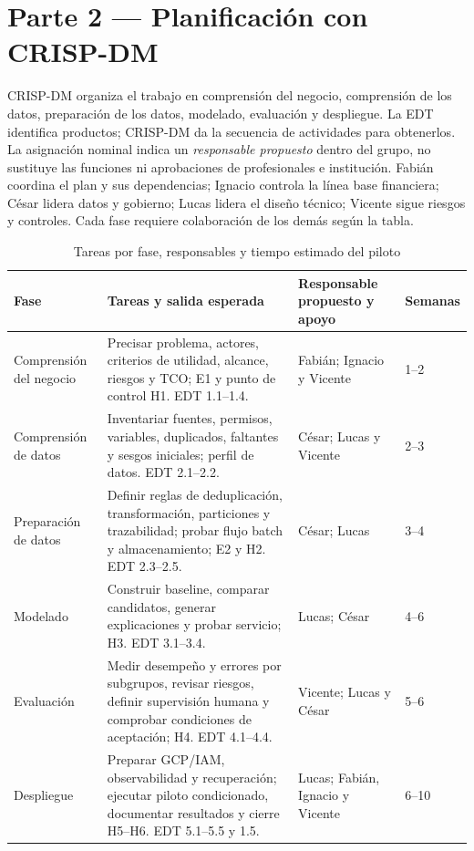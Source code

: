 \documentclass[12pt,a4paper]{article}
\begin{document}
\section{Parte 2 --- Planificación con CRISP-DM}

CRISP-DM organiza el trabajo en comprensión del negocio, comprensión de los datos, preparación de los datos, modelado, evaluación y despliegue. La EDT identifica productos; CRISP-DM da la secuencia de actividades para obtenerlos. La asignación nominal indica un \emph{responsable propuesto} dentro del grupo, no sustituye las funciones ni aprobaciones de profesionales e institución. Fabián coordina el plan y sus dependencias; Ignacio controla la línea base financiera; César lidera datos y gobierno; Lucas lidera el diseño técnico; Vicente sigue riesgos y controles. Cada fase requiere colaboración de los demás según la tabla.

\begin{table}[H]
  \centering
  \caption{Tareas por fase, responsables y tiempo estimado del piloto}
  \label{tab:act2-crisp}
  \scriptsize
  \begin{tabularx}{\textwidth}{@{}p{2.15cm}X p{2.9cm}p{1.1cm}@{}}
    \toprule
    Fase & Tareas y salida esperada & Responsable propuesto y apoyo & Semanas \\
    \midrule
    Comprensión del negocio & Precisar problema, actores, criterios de utilidad, alcance, riesgos y TCO; E1 y punto de control H1. EDT 1.1--1.4. & Fabián; Ignacio y Vicente & 1--2 \\
    Comprensión de datos & Inventariar fuentes, permisos, variables, duplicados, faltantes y sesgos iniciales; perfil de datos. EDT 2.1--2.2. & César; Lucas y Vicente & 2--3 \\
    Preparación de datos & Definir reglas de deduplicación, transformación, particiones y trazabilidad; probar flujo batch y almacenamiento; E2 y H2. EDT 2.3--2.5. & César; Lucas & 3--4 \\
    Modelado & Construir baseline, comparar candidatos, generar explicaciones y probar servicio; H3. EDT 3.1--3.4. & Lucas; César & 4--6 \\
    Evaluación & Medir desempeño y errores por subgrupos, revisar riesgos, definir supervisión humana y comprobar condiciones de aceptación; H4. EDT 4.1--4.4. & Vicente; Lucas y César & 5--6 \\
    Despliegue & Preparar GCP/IAM, observabilidad y recuperación; ejecutar piloto condicionado, documentar resultados y cierre H5--H6. EDT 5.1--5.5 y 1.5. & Lucas; Fabián, Ignacio y Vicente & 6--10 \\
    \bottomrule
  \end{tabularx}
\end{table}
\end{document}
